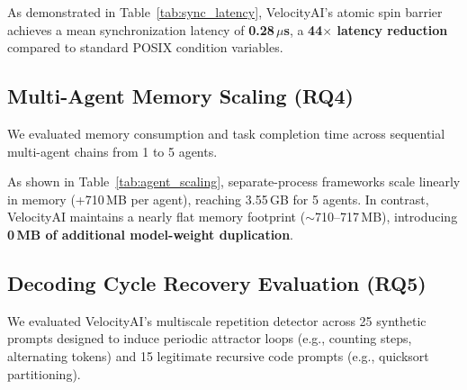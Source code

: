 \documentclass[10pt,twocolumn]{article}
\begin{document}
As demonstrated in Table~\ref{tab:sync_latency}, VelocityAI's atomic spin barrier achieves a mean synchronization latency of \textbf{0.28\,$\mu$s}, a \textbf{44$\times$ latency reduction} compared to standard POSIX condition variables.

\subsection{Multi-Agent Memory Scaling (RQ4)}
We evaluated memory consumption and task completion time across sequential multi-agent chains from 1 to 5 agents.

\begin{table}[htbp]
\caption{Multi-Agent Memory \& Execution Scaling (SmolLM2-360M)}
\label{tab:agent_scaling}
\centering
{}
\end{table}

As shown in Table~\ref{tab:agent_scaling}, separate-process frameworks scale linearly in memory (+710\,MB per agent), reaching 3.55\,GB for 5 agents. In contrast, VelocityAI maintains a nearly flat memory footprint ($\sim$710--717\,MB), introducing \textbf{0\,MB of additional model-weight duplication}.

\subsection{Decoding Cycle Recovery Evaluation (RQ5)}
We evaluated VelocityAI's multiscale repetition detector across 25 synthetic prompts designed to induce periodic attractor loops (e.g., counting steps, alternating tokens) and 15 legitimate recursive code prompts (e.g., quicksort partitioning).
\end{document}
